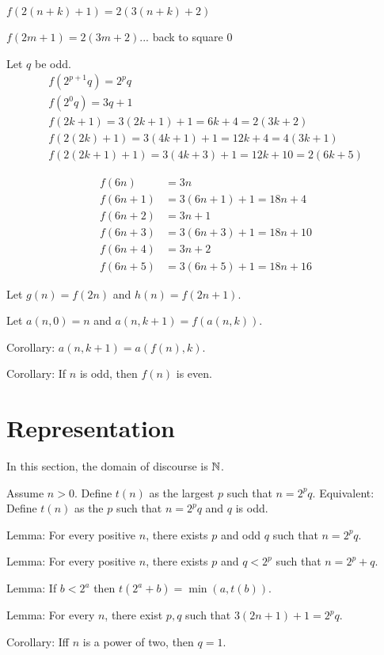 \(f(2(n+k)+1) = 2(3(n+k)+2)\)

\(f(2m+1) = 2(3m+2)\)... back to square 0

Let \(q\) be odd.
\begin{align*}
    f(2^{p+1} q) = 2^p q
    \\
    f(2^0 q) = 3q + 1
    \\
    f(2k+1) = 3(2k+1) + 1 = 6k+4 = 2(3k+2)
    \\
    f(2(2k)+1) = 3(4k+1) + 1 = 12k+4 = 4(3k+1)
    \\
    f(2(2k+1)+1) = 3(4k+3) + 1 = 12k+10 = 2(6k+5)
\end{align*}

\begin{align*}
    f(6n) &= 3n
    \\
    f(6n+1) &= 3(6n+1)+1 = 18n+4
    \\
    f(6n+2) &= 3n+1
    \\
    f(6n+3) &= 3(6n+3) + 1 = 18n+10
    \\
    f(6n+4) &= 3n+2
    \\
    f(6n+5) &= 3(6n+5) + 1 = 18n+16
\end{align*}

Let \(g(n) = f(2n)\) and \(h(n) = f(2n+1)\).

Let \(a(n,0) = n\) and \(a(n,k+1) = f(a(n,k))\).

Corollary: \(a(n,k+1) = a(f(n),k)\).

Corollary: If \(n\) is odd, then \(f(n)\) is even.

\section{Representation}

In this section, the domain of discourse is \(\mathbb{N}\).

Assume \(n > 0\).
Define \(t(n)\) as the largest \(p\) such that \(n = 2^p q\).
Equivalent:
Define \(t(n)\) as the \(p\) such that \(n = 2^p q\) and \(q\) is odd.

Lemma:
For every positive \(n\), there exists \(p\) and odd \(q\) such that \(n = 2^p q\).

Lemma:
For every positive \(n\), there exists \(p\) and \(q < 2^p\) such that \(n = 2^p + q\).

Lemma: If \(b < 2^a\) then \(t(2^a + b) = \min(a,t(b))\).

Lemma: For every \(n\), there exist \(p,q\) such that \(3(2n+1)+1 = 2^p q\).

Corollary: Iff \(n\) is a power of two, then \(q = 1\).

